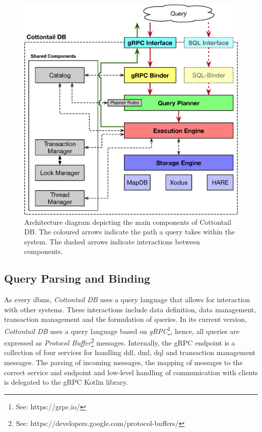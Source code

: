\begin{figure}[bt]
    \centering
    \includegraphics[width=\textwidth]{figures/architecture.eps}
    \caption{Architecture diagram depicting the main components of Cottontail DB. The coloured arrows indicate the path a query takes within the system. The dashed arrows indicate interactions between components.}
    \label{figure:cottontail_architecture}
\end{figure}

\subsection{Query Parsing and Binding}
As every \acrshort{dbms}, \emph{Cottontail DB} uses a query language that allows for interaction with other systems. These interactions include data definition, data management, transaction management and the formulation of queries. In its current version, \emph{Cottontail DB} uses a query language based on \emph{gRPC}\footnote{See: https://grpc.io/}, hence, all queries are expressed as \emph{Protocol Buffer}\footnote{See: https://developers.google.com/protocol-buffers/} messages. Internally, the gRPC endpoint is a collection of four services for handling \acrshort{ddl}, \acrshort{dml}, \acrshort{dql} and transaction management messages. The parsing of incoming messages, the mapping of messages to the correct service and endpoint and low-level handling of communication with clients is delegated to the gRPC Kotlin library. 

